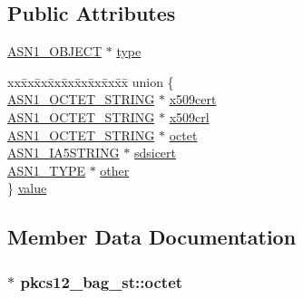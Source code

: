 \subsection*{Public Attributes}
\begin{DoxyCompactItemize}
\item 
\hyperlink{asn1_8h_ae10c08e4e6b23f67a39b2add932ec48f}{A\+S\+N1\+\_\+\+O\+B\+J\+E\+CT} $\ast$ \hyperlink{structpkcs12__bag__st_a6f70869478b661dce62ea8f340d15086}{type}
\item 
\begin{tabbing}
xx\=xx\=xx\=xx\=xx\=xx\=xx\=xx\=xx\=\kill
union \{\\
\>\hyperlink{ossl__typ_8h_afbd05e94e0f0430a2b729473efec88c1}{ASN1\_OCTET\_STRING} $\ast$ \hyperlink{structpkcs12__bag__st_ad225f5e04a52314cc4ec5709c9d1be37}{x509cert}\\
\>\hyperlink{ossl__typ_8h_afbd05e94e0f0430a2b729473efec88c1}{ASN1\_OCTET\_STRING} $\ast$ \hyperlink{structpkcs12__bag__st_a64e2e519c49c1a84def0ebd33cb78d4c}{x509crl}\\
\>\hyperlink{ossl__typ_8h_afbd05e94e0f0430a2b729473efec88c1}{ASN1\_OCTET\_STRING} $\ast$ \hyperlink{structpkcs12__bag__st_ad5434371541629b0a7e46cbdad65f256}{octet}\\
\>\hyperlink{ossl__typ_8h_a0d915c339a64c1c9871d5404e51c44fd}{ASN1\_IA5STRING} $\ast$ \hyperlink{structpkcs12__bag__st_a46aa6c93860987d5a73db9561b38d1f9}{sdsicert}\\
\>\hyperlink{asn1_8h_a7895e03d9fee2bc4963faf2a31a9439e}{ASN1\_TYPE} $\ast$ \hyperlink{structpkcs12__bag__st_af8e322c20762b320aec20f09c03a720f}{other}\\
\} \hyperlink{structpkcs12__bag__st_a2756cb4c0a099415d6df46142a2a5978}{value}\\

\end{tabbing}\end{DoxyCompactItemize}


\subsection{Member Data Documentation}
\subsubsection[{\texorpdfstring{octet}{octet}}]{$\ast$ pkcs12\+\_\+bag\+\_\+st\+::octet}\hypertarget{structpkcs12__bag__st_ad5434371541629b0a7e46cbdad65f256}{}\label{structpkcs12__bag__st_ad5434371541629b0a7e46cbdad65f256}
